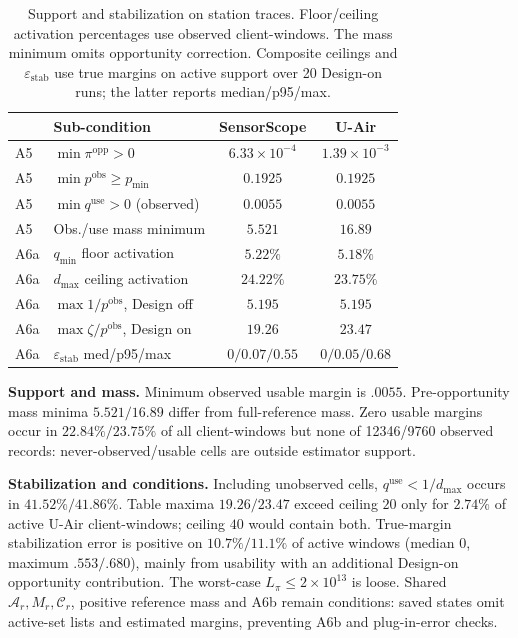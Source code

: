 \begin{table}[!htbp]
\centering
\caption{Support and stabilization on station traces.
Floor/ceiling activation percentages use observed client-windows.
The mass minimum omits opportunity correction. Composite ceilings and
$\varepsilon_{\mathrm{stab}}$ use true margins on active support over 20
Design-on runs; the latter reports median/p95/max.}
\label{tab:app_a5_a6_audit}
\footnotesize
\setlength{\tabcolsep}{3pt}
\begin{tabular*}{\columnwidth}{@{\extracolsep{\fill}}llcc}
\toprule
 & Sub-condition & SensorScope & U-Air\\
\midrule
A5 & $\min \pi^{\mathrm{opp}}>0$ & $6.33\times10^{-4}$ & $1.39\times10^{-3}$\\
A5 & $\min p^{\mathrm{obs}}\ge p_{\min}$ & $0.1925$ & $0.1925$\\
A5 & $\min q^{\mathrm{use}}>0$ (observed) & $0.0055$ & $0.0055$\\
A5 & Obs./use mass minimum & $5.521$ & $16.89$\\
\midrule
A6a & $q_{\min}$ floor activation & $5.22\%$ & $5.18\%$\\
A6a & $d_{\max}$ ceiling activation & $24.22\%$ & $23.75\%$\\
A6a & $\max 1/p^{\mathrm{obs}}$, Design off & $5.195$ & $5.195$\\
A6a & $\max \zeta/p^{\mathrm{obs}}$, Design on & $19.26$ & $\mathbf{23.47}$\\
\midrule
A6a & $\varepsilon_{\mathrm{stab}}$ med/p95/max & $0/0.07/0.55$ & $0/0.05/0.68$\\
\bottomrule
\end{tabular*}
\end{table}

\noindent\textbf{Support and mass.}
Minimum observed usable margin is $.0055$. Pre-opportunity mass minima
$5.521/16.89$ differ from full-reference mass. Zero usable margins occur
in $22.84\%/23.75\%$ of all client-windows but none of 12346/9760 observed
records: never-observed/usable cells are outside estimator support.

\noindent\textbf{Stabilization and conditions.}
Including unobserved cells, $q^{\mathrm{use}}<1/d_{\max}$ occurs in
$41.52\%/41.86\%$. Table maxima $19.26/23.47$ exceed ceiling $20$ only for
$2.74\%$ of active U-Air client-windows; ceiling $40$ would contain both.
True-margin stabilization error is positive on $10.7\%/11.1\%$ of active
windows (median $0$, maximum $.553/.680$), mainly from usability with an
additional Design-on opportunity contribution. The worst-case
$L_\pi\le2\times10^{13}$ is loose. Shared $\mathcal A_r,M_r,\mathcal C_r$,
positive reference mass and A6b remain conditions: saved states omit
active-set lists and estimated margins, preventing A6b and plug-in-error checks.

